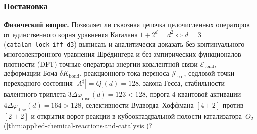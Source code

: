 \label{exp:cerd04}

\subsubsection*{Постановка}
\textbf{Физический вопрос.}
Позволяет ли сквозная цепочка целочисленных операторов от единственного корня уравнения Каталана $1+2^d=d^2 \iff d=3$ (\texttt{catalan\_\allowbreak lock\_\allowbreak iff\_\allowbreak d3}) выписать и аналитически доказать без континуального многоэлектронного уравнения Шрёдингера и без эмпирических функционалов плотности (DFT) точные операторы энергии ковалентной связи $\mathcal{E}_{\mathrm{bond}}$, деформации Бома $\delta K_{\mathrm{bond}}$, реакционного тока переноса $\mathcal{J}_{\mathrm{rxn}}$, седловой точки переходного состояния $|A^\ddagger| = Q_\square(d) = 128$, закона Гесса, стабильности валентного триплета $3\Delta\varphi_{\mathrm{disc}}(d) = 123 < 128$, порога $4$-квантовой активации $4\Delta\varphi_{\mathrm{disc}}(d) = 164 > 128$, селективности Вудворда--Хоффмана $[4+2]$ против $[2+2]$ и открытия ворот реакции в кубооктаэдральной полости катализатора~$O_2$ (\cref{thm:applied-chemical-reactions-and-catalysis})?

